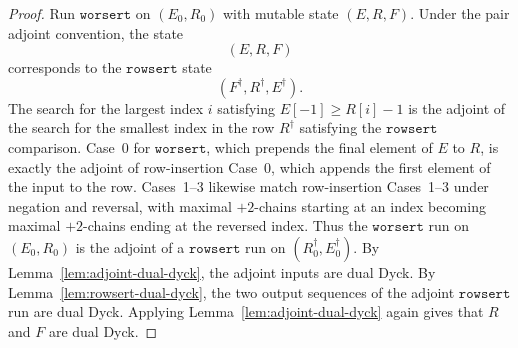 \documentclass[11pt]{article}
\theoremstyle{plain}
\theoremstyle{definition}
\theoremstyle{remark}
\newcommand{\rowsert}{\texttt{rowsert}}
\newcommand{\worsert}{\texttt{worsert}}
\begin{document}
\begin{proof}
Run \(\worsert\) on \((E_0,R_0)\) with mutable state
\((E,R,F)\).  Under the pair adjoint convention, the state
\[
  (E,R,F)
\]
corresponds to the \(\rowsert\) state
\[
  (F^\dagger,R^\dagger,E^\dagger).
\]
The search for the largest index \(i\) satisfying \(E[-1]\ge R[i]-1\) is the
adjoint of the search for the smallest index in the row \(R^\dagger\) satisfying
the \(\rowsert\) comparison.  Case~0 for \(\worsert\), which prepends the final
element of \(E\) to \(R\), is exactly the adjoint of row-insertion Case~0, which
appends the first element of the input to the row.  Cases~1--3 likewise match
row-insertion Cases~1--3 under negation and reversal, with maximal \(+2\)-chains
starting at an index becoming maximal \(+2\)-chains ending at the reversed
index.
Thus the \(\worsert\) run on \((E_0,R_0)\) is the adjoint of a \(\rowsert\) run
on \((R_0^\dagger,E_0^\dagger)\).  By
Lemma~\ref{lem:adjoint-dual-dyck}, the adjoint inputs are dual Dyck.  By
Lemma~\ref{lem:rowsert-dual-dyck}, the two output sequences of the adjoint
\(\rowsert\) run are dual Dyck.  Applying Lemma~\ref{lem:adjoint-dual-dyck}
again gives that \(R\) and \(F\) are dual Dyck.
\end{proof}
\end{document}
